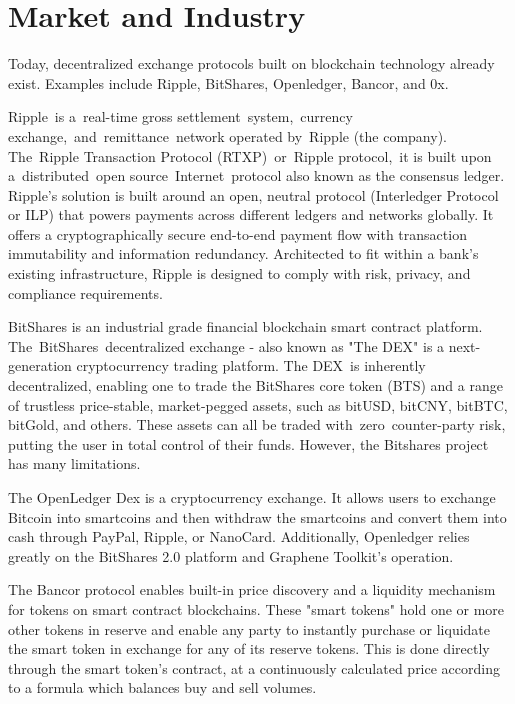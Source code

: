 \documentclass[UTF8,nofonts]{article}
\begin{document}
\section{Market and Industry\label{sec: existingworks}}

Today, decentralized exchange protocols built on blockchain technology already exist. Examples include Ripple, BitShares, Openledger, Bancor, and 0x.

Ripple\cite{schwartz2014ripple} is a real-time gross settlement system, currency exchange, and remittance network operated by Ripple (the company). The Ripple Transaction Protocol (RTXP) or Ripple protocol, it is built upon a distributed open source Internet protocol also known as the consensus ledger. Ripple's solution is built around an open, neutral protocol (Interledger Protocol or ILP\cite{thomas2015protocol}) that powers payments across different ledgers and networks globally. It offers a cryptographically secure end-to-end payment flow with transaction immutability and information redundancy. Architected to fit within a bank's existing infrastructure, Ripple is designed to comply with risk, privacy, and compliance requirements.

BitShares\cite{schuhbitshares}\cite{schuh2015bitshares} is an industrial grade financial blockchain smart contract platform. The BitShares decentralized exchange - also known as "The DEX" is a next-generation cryptocurrency trading platform. The DEX is inherently decentralized, enabling one to trade the BitShares core token (BTS) and a range of trustless price-stable, market-pegged assets, such as bitUSD, bitCNY, bitBTC, bitGold, and others. These assets can all be traded with zero counter-party risk, putting the user in total control of their funds. However, the Bitshares project has many limitations.

The OpenLedger Dex\cite{openledger} is a cryptocurrency exchange. It allows users to exchange Bitcoin into smartcoins and then withdraw the smartcoins and convert them into cash through PayPal, Ripple, or NanoCard. Additionally, Openledger relies greatly on the BitShares 2.0 platform and Graphene Toolkit's operation.

The Bancor\cite{bancor}\cite{hanson2012logarithmic} protocol enables built-in price discovery and a liquidity mechanism for tokens on smart contract blockchains. These "smart tokens" hold one or more other tokens in reserve and enable any party to instantly purchase or liquidate the smart token in exchange for any of its reserve tokens. This is done directly through the smart token's contract, at a continuously calculated price according to a formula which balances buy and sell volumes.
\end{document}
